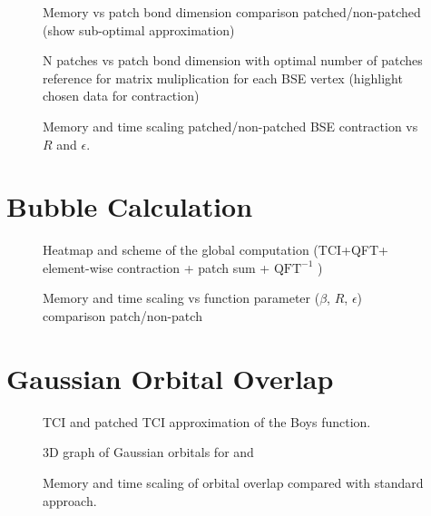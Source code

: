 \begin{figure}[ht!]
    \caption{Memory vs patch bond dimension comparison patched/non-patched (show sub-optimal approximation)}
\end{figure}

\begin{figure}[ht!]
    \caption{N patches vs patch bond dimension with optimal number of patches reference for matrix muliplication for each BSE vertex (highlight chosen data for contraction)}
\end{figure}

\begin{figure}[ht!]
    \caption{Memory and time scaling patched/non-patched BSE contraction vs $R$ and $\epsilon$.}
\end{figure}

\section{Bubble Calculation}

\begin{figure}[ht!]
    \caption{Heatmap and scheme of the global computation (TCI+QFT+ element-wise contraction + patch sum + $\textrm{QFT}^{-1}$ )}
\end{figure}

\begin{figure}[ht!]
    \caption{Memory and time scaling vs function parameter ($\beta$, $R$, $\epsilon$) comparison patch/non-patch }
\end{figure}


\section{Gaussian Orbital Overlap}


\begin{figure}[ht!]
    \caption{TCI and patched TCI approximation of the Boys function.}
\end{figure}

\begin{figure}[ht!]
    \caption{3D graph of Gaussian orbitals for  and }
\end{figure}

\begin{figure}[ht!]
    \caption{Memory and time scaling of orbital overlap compared with standard approach. }
\end{figure}


